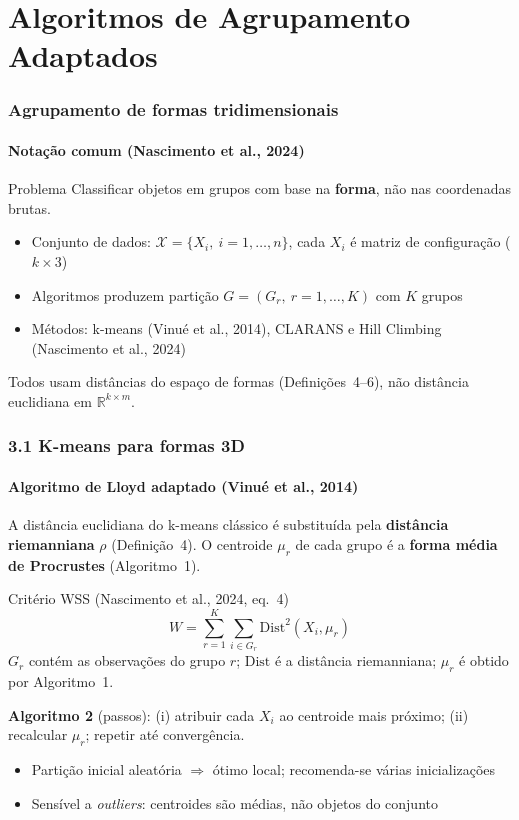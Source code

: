 \documentclass[brazilian,11pt]{beamer}
\begin{document}
\section[Algoritmos]{Algoritmos de Agrupamento Adaptados}

\begin{frame}
    \frametitle{Agrupamento de formas tridimensionais}
    \framesubtitle{Notação comum (Nascimento et al., 2024)}

    \begin{block}{Problema}
        Classificar objetos em grupos com base na \textbf{forma}, não nas coordenadas brutas.
    \end{block}

    \begin{itemize}
        \item Conjunto de dados: $\mathcal{X} = \{X_i,\ i = 1,\ldots,n\}$, cada $X_i$ é matriz de configuração ($k \times 3$)
        \item Algoritmos produzem partição $G = (G_r,\ r = 1,\ldots,K)$ com $K$ grupos
        \item Métodos: k-means (Vinué et al., 2014), CLARANS e Hill Climbing (Nascimento et al., 2024)
    \end{itemize}

    \vspace{0.3em}
    \small Todos usam distâncias do espaço de formas (Definições~4--6), não distância euclidiana em $\mathbb{R}^{k \times m}$.
\end{frame}

\begin{frame}[shrink=8]
    \frametitle{3.1 K-means para formas 3D}
    \framesubtitle{Algoritmo de Lloyd adaptado (Vinué et al., 2014)}

    \small
    A distância euclidiana do k-means clássico é substituída pela \textbf{distância riemanniana} $\rho$ (Definição~4). O centroide $\mu_r$ de cada grupo é a \textbf{forma média de Procrustes} (Algoritmo~1).

    \begin{block}{Critério WSS (Nascimento et al., 2024, eq.~4)}
        \begin{equation}
            W = \sum_{r=1}^{K} \sum_{i \in G_r} \mathrm{Dist}^2(X_i, \mu_r)
        \end{equation}
        $G_r$ contém as observações do grupo $r$; $\mathrm{Dist}$ é a distância riemanniana; $\mu_r$ é obtido por Algoritmo~1.
    \end{block}

    \textbf{Algoritmo 2} (passos): (i) atribuir cada $X_i$ ao centroide mais próximo; (ii) recalcular $\mu_r$; repetir até convergência.

    \begin{itemize}
        \item Partição inicial aleatória $\Rightarrow$ ótimo local; recomenda-se várias inicializações
        \item Sensível a \textit{outliers}: centroides são médias, não objetos do conjunto
    \end{itemize}
\end{frame}
\end{document}
